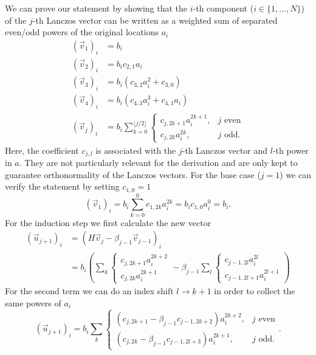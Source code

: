 We can prove our statement by showing that the $i$-th component ($i \in \{1, \ldots, N\}$)
of the $j$-th Lanczos vector
can be written as a weighted sum
of separated even/odd powers of the original locations $a_i$
\begin{align}
    (\vec{v}_1)_i
     & = b_i                              \\
    (\vec{v}_2)_i
     & = b_i c_{2,1} a_i                  \\
    (\vec{v}_3)_i
     & = b_i ( c_{3,2}a_i^2 + c_{3,0})    \\
    (\vec{v}_4)_i
     & = b_i ( c_{4,3}a_i^3 + c_{4,1}a_i) \\
    (\vec{v}_j)_i
     & =
    b_i\sum\limits_{k=0}^{\lfloor j/2\rfloor}
    \begin{cases}
        c_{j,2k+1} a_i^{2k+1}, & j \text{ even} \\
        c_{j,2k} a_i^{2k},     & j \text{ odd}.
    \end{cases}
    \label{eq:statement-tridiagonalization}
\end{align}
Here, the coefficient $c_{j,l}$ is associated with the $j$-th Lanczos vector
and $l$-th power in $a$.
They are not particularly relevant for the derivation and are only kept to guarantee
orthonormality of the Lanczos vectors.
For the base case ($j=1$) we can verify the statement by setting $c_{1,0}=1$
\begin{equation}
    (\vec{v}_1)_i
    =
    b_i\!\sum\limits_{k=0}^{0} c_{1,2k} a_i^{2k}
    =
    b_i c_{1,0} a_i^0
    =
    b_i.
\end{equation}
For the induction step we first calculate the new vector
\begin{align}
    (\vec{u}_{j+1})_i
     & =
    (H \vec{v}_j - \beta_{j-1}\vec{v}_{j-1})_i \\
     & =
    b_i
    \left(
    \sum\limits_k
    \begin{cases}
        c_{j,2k+1} a_i^{2k+2} \\
        c_{j,2k} a_i^{2k+1}
    \end{cases}
    - \beta_{j-1}
    \sum\limits_l
    \begin{cases}
        c_{j-1,2l} a_i^{2l} \\
        c_{j-1,2l+1} a_i^{2l+1}
    \end{cases}
    \right)
\end{align}
For the second term we can do an index shift $l \rightarrow k+1$
in order to collect the same powers of $a_i$
\begin{equation}
    (\vec{u}_{j+1})_i
    =
    b_i
    \sum\limits_k
    \begin{cases}
        (c_{j,2k+1} - \beta_{j-1} c_{j-1,2k+2}) a_i^{2k+2}, & j \text{ even} \\
        (c_{j,2k} - \beta_{j-1} c_{j-1,2l+3}) a_i^{2k+1},   & j \text{ odd}.
    \end{cases}.
\end{equation}
